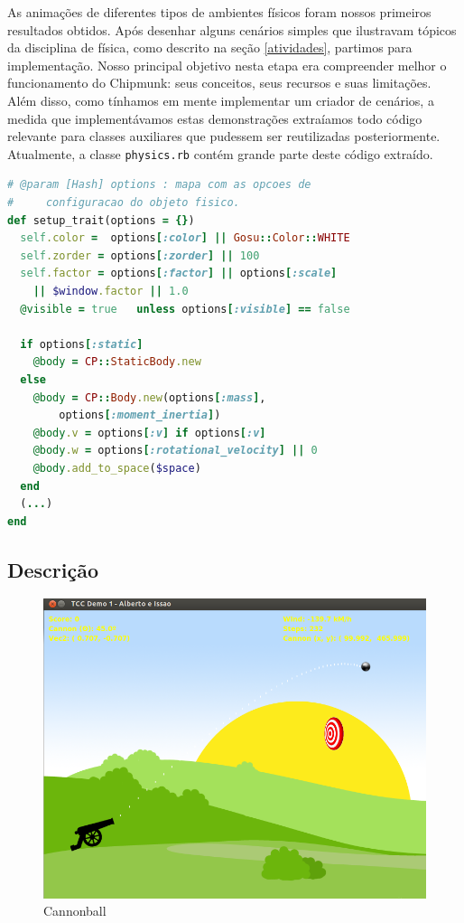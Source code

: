 As animações de diferentes tipos de ambientes físicos foram nossos primeiros resultados obtidos. Após desenhar alguns cenários simples que ilustravam tópicos da disciplina de física, como descrito na seção \ref{atividades}, partimos para implementação. Nosso principal objetivo nesta etapa era compreender melhor o funcionamento do Chipmunk: seus conceitos, seus recursos e suas limitações. \\

Além disso, como tínhamos em mente implementar um criador de cenários, a medida que implementávamos estas demonstrações extraíamos todo código relevante para classes auxiliares que pudessem ser reutilizadas posteriormente. Atualmente, a classe {\tt physics.rb} contém grande parte deste código extraído. \\

\begin{lstlisting}[language=Ruby, caption=Trecho de código do physics.rb]
# @param [Hash] options : mapa com as opcoes de 
#     configuracao do objeto fisico.
def setup_trait(options = {})
  self.color =  options[:color] || Gosu::Color::WHITE
  self.zorder = options[:zorder] || 100
  self.factor = options[:factor] || options[:scale] 
    || $window.factor || 1.0
  @visible = true   unless options[:visible] == false

  if options[:static]
    @body = CP::StaticBody.new
  else
    @body = CP::Body.new(options[:mass], 
        options[:moment_inertia])
    @body.v = options[:v] if options[:v]  
    @body.w = options[:rotational_velocity] || 0
    @body.add_to_space($space)
  end
  (...)
end
\end{lstlisting}

\subsection{Descrição}

\begin{figure}[H]
	\centering
	\includegraphics[scale=0.4]{images/cannonball.png}
	\caption{Cannonball}
	\hspace{0.5cm}
\end{figure}


